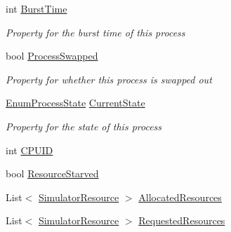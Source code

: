 \begin{DoxyCompactItemize}
int \hyperlink{class_c_p_u___o_s___simulator_1_1_operating___system_1_1_simulator_process_a5a340d3421e4251b758752de009b7758}{Burst\+Time}
\begin{DoxyCompactList}\small\item\em Property for the burst time of this process \end{DoxyCompactList}\item 
bool \hyperlink{class_c_p_u___o_s___simulator_1_1_operating___system_1_1_simulator_process_a7886e0890797887fcdd65b6eac62cfc0}{Process\+Swapped}
\begin{DoxyCompactList}\small\item\em Property for whether this process is swapped out \end{DoxyCompactList}\item 
\hyperlink{namespace_c_p_u___o_s___simulator_1_1_operating___system_a836ee2204e78fcb3a7dd6c3c942b1a24}{Enum\+Process\+State} \hyperlink{class_c_p_u___o_s___simulator_1_1_operating___system_1_1_simulator_process_ab63488f4cf4710d3f1d84c5f9d8be797}{Current\+State}
\begin{DoxyCompactList}\small\item\em Property for the state of this process \end{DoxyCompactList}\item 
int \hyperlink{class_c_p_u___o_s___simulator_1_1_operating___system_1_1_simulator_process_a456868adfff49f66200bb95a7b64a182}{C\+P\+U\+I\+D}
\item 
bool \hyperlink{class_c_p_u___o_s___simulator_1_1_operating___system_1_1_simulator_process_a6475f63c13feaefb3a5fbfc349ad4f2f}{Resource\+Starved}
\item 
List$<$ \hyperlink{class_c_p_u___o_s___simulator_1_1_operating___system_1_1_simulator_resource}{Simulator\+Resource} $>$ \hyperlink{class_c_p_u___o_s___simulator_1_1_operating___system_1_1_simulator_process_ade5c0229b48d911a0a4a8d6a66567a2f}{Allocated\+Resources}
\item 
List$<$ \hyperlink{class_c_p_u___o_s___simulator_1_1_operating___system_1_1_simulator_resource}{Simulator\+Resource} $>$ \hyperlink{class_c_p_u___o_s___simulator_1_1_operating___system_1_1_simulator_process_a116d320293064d278affda3fe9292d68}{Requested\+Resources}

\end{DoxyCompactItemize}
